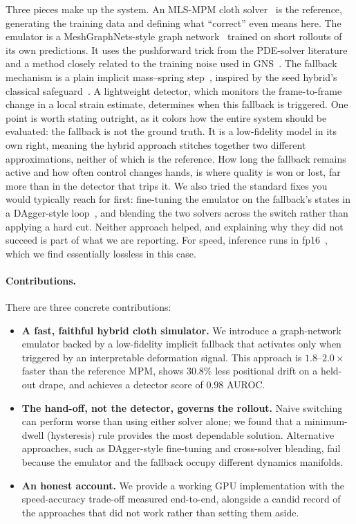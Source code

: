 \documentclass{article}
\begin{document}
Three pieces make up the system. An MLS-MPM cloth solver~\citep{hu2018mlsmpm,
jiang2016mpm} is the reference, generating the training data and defining what
``correct'' even means here. The emulator is a MeshGraphNets-style graph
network~\citep{pfaff2021mgn} trained on short rollouts of its own predictions. It uses the
pushforward trick from the PDE-solver literature~\citep{brandstetter2022mpnn} and a
method closely related to the training noise used in GNS~\citep{sanchez2020gns}. The fallback mechanism is
a plain implicit mass--spring step~\citep{baraff1998}, inspired by the seed
hybrid's classical safeguard~\citep{xu2025hybridmpm}. A lightweight detector, which monitors the frame-to-frame change in a local strain estimate, determines when this fallback is triggered.
One point is worth stating outright, as it colors how the entire system should be evaluated: the fallback is not the ground truth. It is a low-fidelity model in its own right, meaning the hybrid approach stitches together two different approximations, neither of which is the reference. How long the fallback remains active and how often control changes hands, is where quality is won or lost, far more than in the detector that trips it. We also tried the standard fixes you would typically reach for first: fine-tuning the
emulator on the fallback's states in a DAgger-style
loop~\citep{ross2011dagger}, and blending the two solvers across the switch rather
than applying a hard cut. Neither approach helped, and explaining why they did not succeed is part of what we are reporting. For speed, inference runs in fp16~\citep{micikevicius2018mixed}, which we
find essentially lossless in this case.

\paragraph{Contributions.} 
There are three concrete contributions:
\begin{itemize}
  \item \textbf{A fast, faithful hybrid cloth simulator.} We introduce a graph-network emulator backed by a low-fidelity implicit fallback that activates only when triggered by an interpretable deformation signal. This approach is $1.8$--$2.0\times$ faster than the reference MPM, shows 
  $30.8\%$ less positional drift on a held-out drape, and achieves a detector score of $0.98$ AUROC.
  \item \textbf{The hand-off, not the detector, governs the rollout.} Naive switching can perform worse than using either solver alone; we found that a minimum-dwell (hysteresis) rule provides the most dependable solution. Alternative approaches, such as DAgger-style fine-tuning and cross-solver blending, fail because the emulator and the fallback occupy different dynamics manifolds.
  \item \textbf{An honest account.} We provide a working GPU implementation with the speed-accuracy trade-off measured end-to-end, alongside a candid record of the approaches that did not work rather than setting them aside.
\end{itemize}
\end{document}
